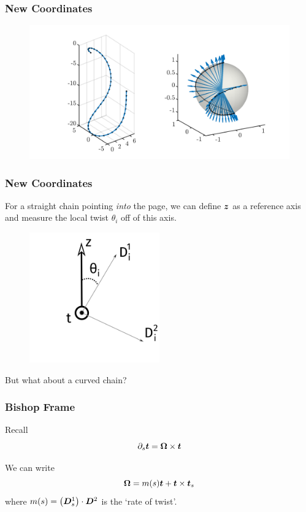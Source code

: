 \documentclass{beamer}
\begin{document}
\begin{frame}
\frametitle{New Coordinates}
\begin{figure}
\includegraphics[width=1\textwidth]{./Cartoons/Tangent_Sphere.png}
\end{figure}
\end{frame}



\begin{frame}
\frametitle{New Coordinates}
For a straight chain pointing \emph{into} the page, we can define $\boldsymbol{z}$ as a reference axis and measure the local twist $\theta_i$ off of this axis. 
\begin{figure}
\includegraphics[height=0.6\textheight,width=0.5\textwidth]{./Cartoons/Theta.pdf}
\end{figure}
\alert{But what about a curved chain?}
\end{frame}

\begin{frame}
\frametitle{Bishop Frame}
\begin{alertblock}{Recall}
\[
\partial_{s} \boldsymbol{t} = \boldsymbol{\Omega} \times \boldsymbol{t}
\]
\end{alertblock}
We can write 
\[
\boldsymbol{\Omega} = m(s) \boldsymbol{t} + \boldsymbol{t} \times  \boldsymbol{t}_{s}
\]
where $m(s) = \left( \boldsymbol{D}^{1}_{s} \right) \cdot \boldsymbol{D}^{2}$ is the `rate of twist'.
\end{frame} 
  
\end{document}
